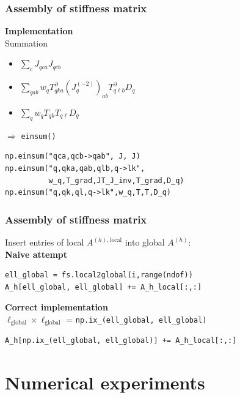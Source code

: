 \documentclass{beamer}
\begin{document}
\begin{frame}[fragile]
  \frametitle{Assembly of stiffness matrix}
  \textbf{Implementation}\\[1ex]
  Summation
  \begin{itemize}
  \item $\sum_{c} J_{qca}J_{qcb}$
  \item $\sum_{qab}w_q  T^\partial_{qka}(J^{(-2)}_q)_{ab} T^\partial_{q\ell b} D_q$
  \item $\sum_{q}w_q  T_{qk} T_{q\ell} D_q$
  \end{itemize}
  $\Rightarrow$ \lstinline{einsum()}
  \begin{lstlisting}
np.einsum("qca,qcb->qab", J, J)
np.einsum("q,qka,qab,qlb,q->lk",
          w_q,T_grad,JT_J_inv,T_grad,D_q)
np.einsum("q,qk,ql,q->lk",w_q,T,T,D_q)
  \end{lstlisting}
\end{frame}


\begin{frame}[fragile]
  \frametitle{Assembly of stiffness matrix}
Insert entries of local $A^{(h),\text{local}}$ into global $A^{(h)}$:\\[1ex]
\textbf{Naive attempt}
\begin{lstlisting}
ell_global = fs.local2global(i,range(ndof))
A_h[ell_global, ell_global] += A_h_local[:,:]
\end{lstlisting}
\textbf{Correct implementation}\\
$\ell_{\text{global}}\times \ell_{\text{global}}$ = \lstinline{np.ix_(ell_global, ell_global)}
\begin{lstlisting}
A_h[np.ix_(ell_global, ell_global)] += A_h_local[:,:]
\end{lstlisting}
\end{frame}


\section{Numerical experiments}


\begin{frame}
  \tableofcontents[currentsection]
\end{frame}
\end{document}
